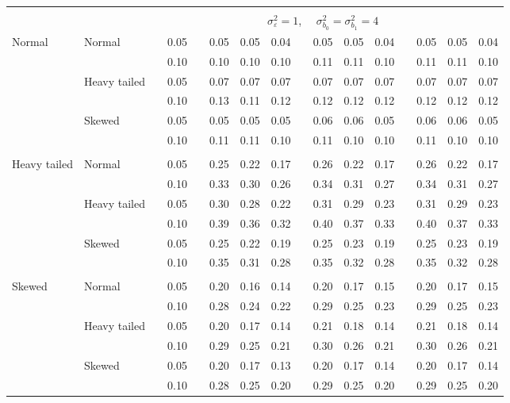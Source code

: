\documentclass{article} %
\begin{document}
\begin{table}[ht]
\begin{scriptsize}
\begin{center}
\begin{tabular}{ll p{.1cm} c p{.1cm} rrr p{.1cm} rrr p{.1cm} rrr}
&&&&&&&&&&&&&&&\\
& && && \multicolumn{9}{c}{$\sigma_{\varepsilon}^2 = 1$, \ \ $\sigma_{b_0}^2 = \sigma_{b_1}^2 = 4$} \\ \cline{6-16}
\rowcolor{gray!20}Normal       & Normal       && 0.05 &&   0.05 & 0.05 & 0.04 && 0.05 & 0.05 & 0.04 && 0.05 & 0.05 & 0.04 \\ 
\rowcolor{gray!20}             &              && 0.10 &&   0.10 & 0.10 & 0.10 && 0.11 & 0.11 & 0.10 && 0.11 & 0.11 & 0.10 \\ 
\rowcolor{gray!20}             & Heavy tailed && 0.05 &&   0.07 & 0.07 & 0.07 && 0.07 & 0.07 & 0.07 && 0.07 & 0.07 & 0.07 \\ 
\rowcolor{gray!20}             &              && 0.10 &&   0.13 & 0.11 & 0.12 && 0.12 & 0.12 & 0.12 && 0.12 & 0.12 & 0.12 \\ 
\rowcolor{gray!20}             & Skewed       && 0.05 &&   0.05 & 0.05 & 0.05 && 0.06 & 0.06 & 0.05 && 0.06 & 0.06 & 0.05 \\ 
\rowcolor{gray!20}             &              && 0.10 &&   0.11 & 0.11 & 0.10 && 0.11 & 0.10 & 0.10 && 0.11 & 0.10 & 0.10 \\ 
             &&&&&&&&&&&&&&&\\
Heavy tailed & Normal       && 0.05 &&   0.25 & 0.22 & 0.17 && 0.26 & 0.22 & 0.17 && 0.26 & 0.22 & 0.17 \\ 
             &              && 0.10 &&   0.33 & 0.30 & 0.26 && 0.34 & 0.31 & 0.27 && 0.34 & 0.31 & 0.27 \\ 
             & Heavy tailed && 0.05 &&   0.30 & 0.28 & 0.22 && 0.31 & 0.29 & 0.23 && 0.31 & 0.29 & 0.23 \\ 
             &              && 0.10 &&   0.39 & 0.36 & 0.32 && 0.40 & 0.37 & 0.33 && 0.40 & 0.37 & 0.33 \\ 
             & Skewed       && 0.05 &&   0.25 & 0.22 & 0.19 && 0.25 & 0.23 & 0.19 && 0.25 & 0.23 & 0.19 \\ 
             &              && 0.10 &&   0.35 & 0.31 & 0.28 && 0.35 & 0.32 & 0.28 && 0.35 & 0.32 & 0.28 \\ 
             &&&&&&&&&&&&&&&\\
Skewed       & Normal       && 0.05 &&   0.20 & 0.16 & 0.14 && 0.20 & 0.17 & 0.15 && 0.20 & 0.17 & 0.15 \\ 
             &              && 0.10 &&   0.28 & 0.24 & 0.22 && 0.29 & 0.25 & 0.23 && 0.29 & 0.25 & 0.23 \\ 
             & Heavy tailed && 0.05 &&   0.20 & 0.17 & 0.14 && 0.21 & 0.18 & 0.14 && 0.21 & 0.18 & 0.14 \\ 
             &              && 0.10 &&   0.29 & 0.25 & 0.21 && 0.30 & 0.26 & 0.21 && 0.30 & 0.26 & 0.21 \\ 
             & Skewed       && 0.05 &&   0.20 & 0.17 & 0.13 && 0.20 & 0.17 & 0.14 && 0.20 & 0.17 & 0.14 \\ 
             &              && 0.10 &&   0.28 & 0.25 & 0.20 && 0.29 & 0.25 & 0.20 && 0.29 & 0.25 & 0.20 \\ 



\end{tabular}
\end{center}
\end{scriptsize}
\end{table}
\end{document}
